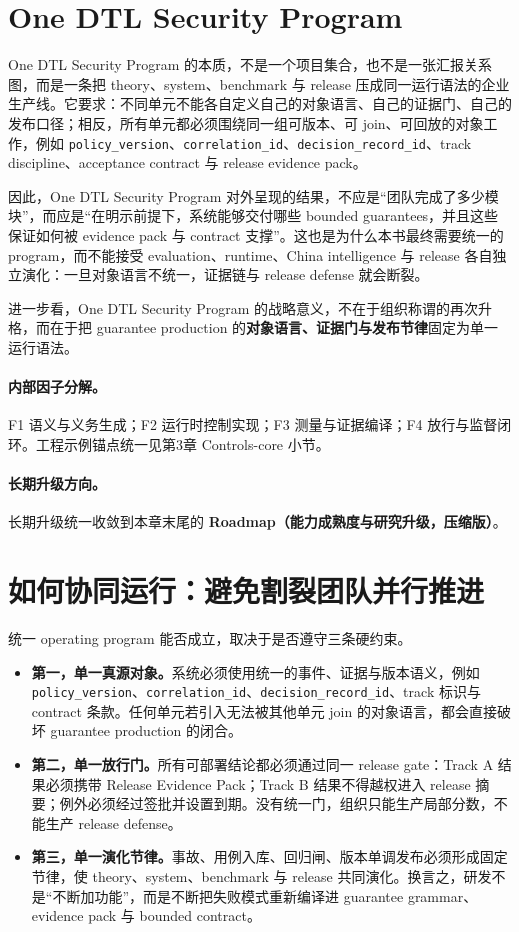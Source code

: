 \documentclass[11pt,a4paper]{report}
\begin{document}
\section{One DTL Security Program}
One DTL Security Program 的本质，不是一个项目集合，也不是一张汇报关系图，而是一条把 theory、system、benchmark 与 release 压成同一运行语法的企业生产线。它要求：不同单元不能各自定义自己的对象语言、自己的证据门、自己的发布口径；相反，所有单元都必须围绕同一组可版本、可 join、可回放的对象工作，例如 \texttt{policy\_version}、\texttt{correlation\_id}、\texttt{decision\_record\_id}、track discipline、acceptance contract 与 release evidence pack。

因此，One DTL Security Program 对外呈现的结果，不应是“团队完成了多少模块”，而应是“在明示前提下，系统能够交付哪些 bounded guarantees，并且这些保证如何被 evidence pack 与 contract 支撑”。这也是为什么本书最终需要统一的 program，而不能接受 evaluation、runtime、China intelligence 与 release 各自独立演化：一旦对象语言不统一，证据链与 release defense 就会断裂。

进一步看，One DTL Security Program 的战略意义，不在于组织称谓的再次升格，而在于把 guarantee production 的\textbf{对象语言、证据门与发布节律}固定为单一运行语法。

\paragraph{内部因子分解。}F1 语义与义务生成；F2 运行时控制实现；F3 测量与证据编译；F4 放行与监督闭环。工程示例锚点统一见第3章 Controls-core 小节。

\paragraph{长期升级方向。}长期升级统一收敛到本章末尾的 \textbf{Roadmap（能力成熟度与研究升级，压缩版）}。

\section{如何协同运行：避免割裂团队并行推进}
统一 operating program 能否成立，取决于是否遵守三条硬约束。
\begin{itemize}
  \item \textbf{第一，单一真源对象。}系统必须使用统一的事件、证据与版本语义，例如 \texttt{policy\_version}、\texttt{correlation\_id}、\texttt{decision\_record\_id}、track 标识与 contract 条款。任何单元若引入无法被其他单元 join 的对象语言，都会直接破坏 guarantee production 的闭合。
  \item \textbf{第二，单一放行门。}所有可部署结论都必须通过同一 release gate：Track A 结果必须携带 Release Evidence Pack；Track B 结果不得越权进入 release 摘要；例外必须经过签批并设置到期。没有统一门，组织只能生产局部分数，不能生产 release defense。
  \item \textbf{第三，单一演化节律。}事故、用例入库、回归闸、版本单调发布必须形成固定节律，使 theory、system、benchmark 与 release 共同演化。换言之，研发不是“不断加功能”，而是不断把失败模式重新编译进 guarantee grammar、evidence pack 与 bounded contract。
\end{itemize}
\end{document}
